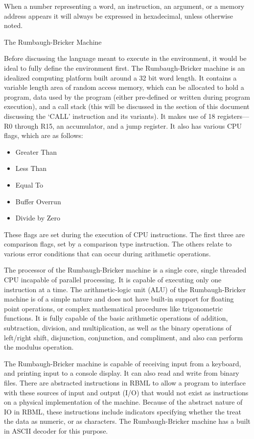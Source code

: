 \documentclass[]{article}
\providecommand{\tightlist}{%
  \setlength{\itemsep}{0pt}\setlength{\parskip}{0pt}}
\begin{document}
When a number representing a word, an instruction, an argument, or a
memory address appears it will always be expressed in hexadecimal,
unless otherwise noted.

The Rumbaugh-Bricker Machine

Before discussing the language meant to execute in the environment, it
would be ideal to fully define the environment first. The
Rumbaugh-Bricker machine is an idealized computing platform built around
a 32 bit word length. It contains a variable length area of random
access memory, which can be allocated to hold a program, data used by
the program (either pre-defined or written during program execution),
and a call stack (this will be discussed in the section of this document
discussing the `CALL' instruction and its variants). It makes use of 18
registers---R0 through R15, an accumulator, and a jump register. It also
has various CPU flags, which are as follows:

\begin{itemize}
\tightlist
\item
  Greater Than
\item
  Less Than
\item
  Equal To
\item
  Buffer Overrun
\item
  Divide by Zero
\end{itemize}

These flags are set during the execution of CPU instructions. The first
three are comparison flags, set by a comparison type instruction. The
others relate to various error conditions that can occur during
arithmetic operations.

The processor of the Rumbaugh-Bricker machine is a single core, single
threaded CPU incapable of parallel processing. It is capable of
executing only one instruction at a time. The arithmetic-logic unit
(ALU) of the Rumbaugh-Bricker machine is of a simple nature and does not
have built-in support for floating point operations, or complex
mathematical procedures like trigonometric functions. It is fully
capable of the basic arithmetic operations of addition, subtraction,
division, and multiplication, as well as the binary operations of
left/right shift, disjunction, conjunction, and compliment, and also can
perform the modulus operation.~

The Rumbaugh-Bricker machine is capable of receiving input from a
keyboard, and printing input to a console display. It can also read and
write from binary files. There are abstracted instructions in RBML to
allow a program to interface with these sources of input and output
(I/O) that would not exist as instructions on a physical implementation
of the machine. Because of the abstract nature of IO in RBML, these
instructions include indicators specifying whether the treat the data as
numeric, or as characters. The Rumbaugh-Bricker machine has a built in
ASCII decoder for this purpose.
\end{document}
